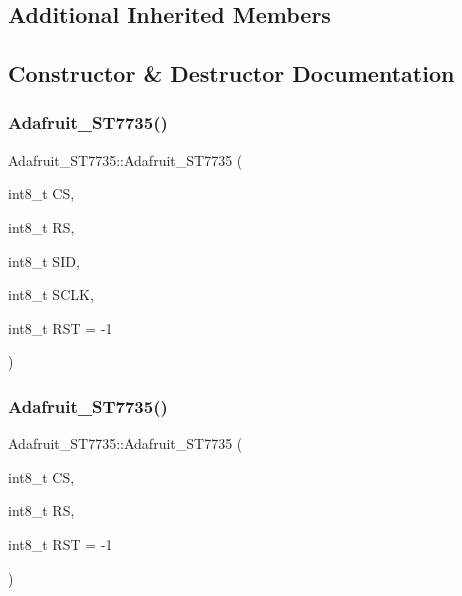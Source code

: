 \subsection*{Additional Inherited Members}


\subsection{Constructor \& Destructor Documentation}
\mbox{\label{class_adafruit___s_t7735_a920ee9f984e79dcddc6a60e306d9b446}} 
\subsubsection{\texorpdfstring{Adafruit\+\_\+\+S\+T7735()}{Adafruit\_ST7735()}\hspace{0.1cm}{\footnotesize\ttfamily [1/2]}}
{\footnotesize\ttfamily Adafruit\+\_\+\+S\+T7735\+::\+Adafruit\+\_\+\+S\+T7735 (\begin{DoxyParamCaption}\item[{int8\+\_\+t}]{CS,  }\item[{int8\+\_\+t}]{RS,  }\item[{int8\+\_\+t}]{S\+ID,  }\item[{int8\+\_\+t}]{S\+C\+LK,  }\item[{int8\+\_\+t}]{R\+ST = {\ttfamily -\/1} }\end{DoxyParamCaption})}

\mbox{\label{class_adafruit___s_t7735_aa1a91d0c5e8c2a28dbddffccea27dc9b}} 
\subsubsection{\texorpdfstring{Adafruit\+\_\+\+S\+T7735()}{Adafruit\_ST7735()}\hspace{0.1cm}{\footnotesize\ttfamily [2/2]}}
{\footnotesize\ttfamily Adafruit\+\_\+\+S\+T7735\+::\+Adafruit\+\_\+\+S\+T7735 (\begin{DoxyParamCaption}\item[{int8\+\_\+t}]{CS,  }\item[{int8\+\_\+t}]{RS,  }\item[{int8\+\_\+t}]{R\+ST = {\ttfamily -\/1} }\end{DoxyParamCaption})}



